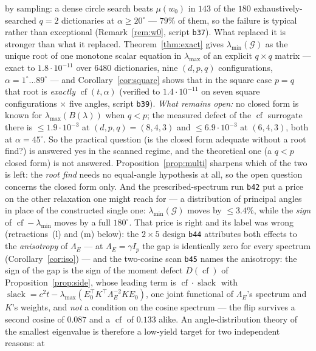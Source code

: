 \documentclass[11pt]{article}
\theoremstyle{remark}
\newcommand{\Gr}{\mathcal{G}}
\newcommand{\Le}{\Lambda_E}
\begin{document}
\begin{enumerate}
by sampling: a dense circle search beats $\mu(w_0)$ in $143$ of the $180$ exhaustively-searched $q=2$
dictionaries at $\alpha\ge20^\circ$ --- $79\%$ of them, so the failure is typical rather than
exceptional (Remark~\ref{rem:w0}, script \texttt{b37}). What replaced it is stronger than
what it replaced. Theorem~\ref{thm:exact} gives $\lambda_{\min}(\Gr)$ as the unique root of one
monotone scalar equation in $\lambda_{\max}$ of an explicit $q\times q$ matrix --- exact to
$1.8\cdot10^{-11}$ over $6480$ dictionaries, nine $(d,p,q)$ configurations,
$\alpha=1^\circ\ldots89^\circ$ --- and Corollary~\ref{cor:square} shows that in the square case
$p=q$ that root is \emph{exactly} $\operatorname{cf}(t,\alpha)$ (verified to $1.4\cdot10^{-11}$ on
seven square configurations $\times$ five angles, script \texttt{b39}).
\emph{What remains open:} no closed form is known for $\lambda_{\max}(B(\lambda))$ when $q<p$; the
measured defect of the $\operatorname{cf}$ surrogate there is $\le1.9\cdot10^{-3}$ at $(d,p,q)
=(8,4,3)$ and $\le6.9\cdot10^{-3}$ at $(6,4,3)$, both at $\alpha=45^\circ$. So the practical question
(is the closed form adequate without a root find?) is answered yes in the scanned regime, and the
theoretical one (a $q<p$ closed form) is not answered. Proposition~\ref{prop:multi} sharpens which of
the two is left: the \emph{root find} needs no equal-angle hypothesis at all, so the open question
concerns the closed form only. And the prescribed-spectrum run \texttt{b42} put a price on the other relaxation one might reach
for --- a distribution of principal angles in place of the constructed single one:
$\lambda_{\min}(\Gr)$ moves by $\le3.4\%$, while the \emph{sign} of
$\operatorname{cf}-\lambda_{\min}$ moves by a full $180^\circ$. That price is right and its label was
wrong (retractions~(l) and (m) below): the $2\times5$ design \texttt{b44} attributes both effects to the
\emph{anisotropy} of $\Le$ --- at $\Le=\gamma I_p$ the gap is identically zero for every spectrum
(Corollary~\ref{cor:iso}) --- and the two-cosine scan \texttt{b45} names the anisotropy: the sign of the gap is the sign of
the moment defect $D(\operatorname{cf})$ of Proposition~\ref{prop:side}, whose leading term is
$\operatorname{cf}\cdot\operatorname{slack}$ with
$\operatorname{slack}=c^{2}t-\lambda_{\max}(E_0^{\top}K^{\top}\Le^{-2}KE_0)$, one joint functional of
$\Le$'s spectrum and $K$'s weights, and \emph{not} a condition on the cosine spectrum --- the flip
survives a second cosine of $0.087$ and a $\operatorname{cf}$ of $0.133$ alike. An angle-distribution
theory of the smallest eigenvalue is therefore a low-yield target for two independent reasons: at

\end{enumerate}
\end{document}

